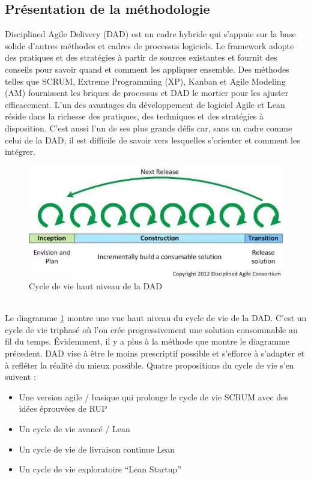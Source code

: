 \begin{spacing}{1.5}
\subsection{Présentation de la méthodologie}
Disciplined Agile Delivery (DAD) est un cadre hybride qui s'appuie sur la base solide d'autres méthodes et cadres de processus logiciels. Le framework adopte des pratiques et des stratégies à partir de sources existantes et fournit des conseils pour savoir quand et comment les appliquer ensemble. Des méthodes telles que SCRUM, Extreme Programming (XP), Kanban et Agile Modeling (AM) fournissent les briques de processus et DAD le mortier pour les ajuster efficacement. L'un des avantages du développement de logiciel Agile et Lean réside dans la richesse des pratiques, des techniques et des stratégies à disposition. C'est aussi l'un de ses plus grands défis car, sans un cadre comme celui de la DAD, il est difficile de savoir vers lesquelles s'orienter et comment les intégrer.\\

\begin{figure}[h]
\centering
\includegraphics[width=0.8\linewidth]{triphaseCycleDAD.jpg}
\caption{Cycle de vie haut niveau de la DAD}
\label{fig:triphaseCycleDAD}
\end{figure}
\\
Le diagramme \ref{fig:triphaseCycleDAD} montre une vue haut niveau du cycle de vie de la DAD. C'est un cycle de vie triphasé où l'on crée progressivement une solution consommable au fil du temps. Évidemment, il y a plus à la méthode que montre le diagramme précedent. DAD vise à être le moins prescriptif possible et s'efforce à s'adapter et à refléter la réalité du mieux possible. Quatre propositions du cycle de vie s'en suivent :
\begin{itemize}
    \item Une version agile / basique qui prolonge le cycle de vie SCRUM avec des idées éprouvées de RUP
    \item Un cycle de vie avancé / Lean
    \item Un cycle de vie de livraison continue Lean
    \item Un cycle de vie exploratoire “Lean Startup”
\end{itemize}\\


\end{spacing}
